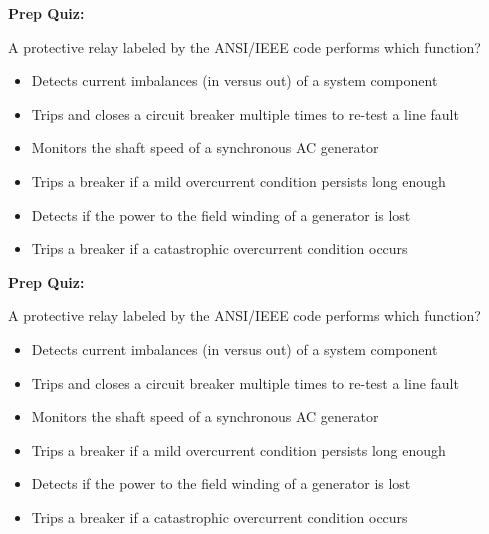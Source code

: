 \vfil \eject

\noindent
{\bf Prep Quiz:}

A protective relay labeled by the ANSI/IEEE code  performs which function?

\begin{itemize}
\item{} Detects current imbalances (in versus out) of a system component
\vskip 5pt 
\item{} Trips and closes a circuit breaker multiple times to re-test a line fault
\vskip 5pt 
\item{} Monitors the shaft speed of a synchronous AC generator
\vskip 5pt 
\item{} Trips a breaker if a mild overcurrent condition persists long enough
\vskip 5pt 
\item{} Detects if the power to the field winding of a generator is lost
\vskip 5pt 
\item{} Trips a breaker if a catastrophic overcurrent condition occurs
\end{itemize}















\vfil \eject

\noindent
{\bf Prep Quiz:}

A protective relay labeled by the ANSI/IEEE code  performs which function?

\begin{itemize}
\item{} Detects current imbalances (in versus out) of a system component
\vskip 5pt 
\item{} Trips and closes a circuit breaker multiple times to re-test a line fault
\vskip 5pt 
\item{} Monitors the shaft speed of a synchronous AC generator
\vskip 5pt 
\item{} Trips a breaker if a mild overcurrent condition persists long enough
\vskip 5pt 
\item{} Detects if the power to the field winding of a generator is lost
\vskip 5pt 
\item{} Trips a breaker if a catastrophic overcurrent condition occurs
\end{itemize}
















